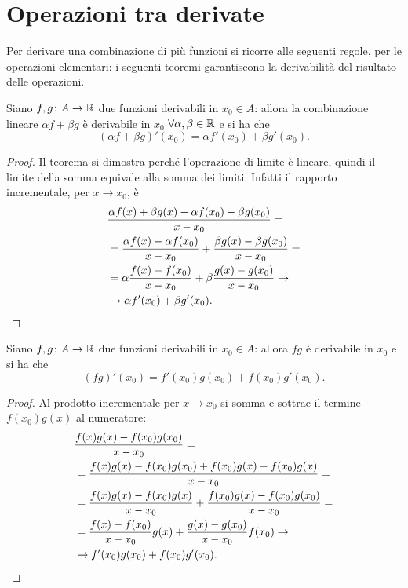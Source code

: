 \section{Operazioni tra derivate}
Per derivare una combinazione di più funzioni si ricorre alle seguenti regole, per le operazioni elementari: i seguenti teoremi garantiscono la derivabilità del risultato delle operazioni.
\begin{proprieta}
Siano $f,g\colon A\to\mathbb{R}$ due funzioni derivabili in $x_0\in A$: allora la combinazione lineare $\alpha f+\beta g$ è derivabile in $x_0$ $\forall\alpha,\beta\in\mathbb{R}$ e si ha che
\begin{equation}
(\alpha f+\beta g)'(x_0)=\alpha f'(x_0)+\beta g'(x_0).
\end{equation}
\end{proprieta}
\begin{proof}
Il teorema si dimostra perché l'operazione di limite è lineare, quindi il limite della somma equivale alla somma dei limiti. Infatti il rapporto incrementale, per $x\to x_0$, è
\begin{align*}
&\frac{\alpha f(x)+\beta g(x)-\alpha f(x_0)-\beta g(x_0)}{x-x_0}=\\
&=\frac{\alpha f(x)-\alpha f(x_0)}{x-x_0}+\frac{\beta g(x)-\beta g(x_0)}{x-x_0}=\\
&=\alpha\frac{f(x)-f(x_0)}{x-x_0}+\beta\frac{g(x)-g(x_0)}{x-x_0}\to\\
&\to\alpha f'(x_0)+\beta g'(x_0).\qedhere
\end{align*}
\end{proof}
\begin{proprieta}[Leibnitz]
Siano $f,g\colon A\to\mathbb{R}$ due funzioni derivabili in $x_0\in A$: allora $fg$ è derivabile in $x_0$ e si ha che
\begin{equation}
(fg)'(x_0)=f'(x_0)g(x_0)+f(x_0)g'(x_0).
\end{equation}
\end{proprieta}
\begin{proof}
Al prodotto incrementale per $x\to x_0$ si somma e sottrae il termine $f(x_0)g(x)$ al numeratore:
\begin{align*}
&\frac{f(x)g(x)-f(x_0)g(x_0)}{x-x_0}=\\
&=\frac{f(x)g(x)-f(x_0)g(x_0)+f(x_0)g(x)-f(x_0)g(x)}{x-x_0}=\\
&=\frac{f(x)g(x)-f(x_0)g(x)}{x-x_0}+\frac{f(x_0)g(x)-f(x_0)g(x_0)}{x-x_0}=\\
&=\frac{f(x)-f(x_0)}{x-x_0}g(x)+\frac{g(x)-g(x_0)}{x-x_0}f(x_0)\to\\
&\to f'(x_0)g(x_0)+f(x_0)g'(x_0).\qedhere
\end{align*}
\end{proof}
